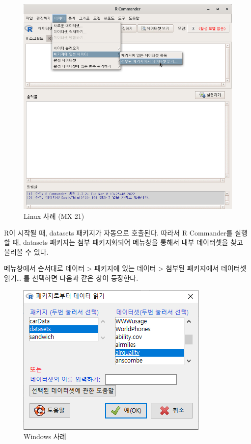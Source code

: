 \documentclass[
]{book}
\begin{document}
\begin{figure}
\centering
\includegraphics{fig/dataset-airquality-01.png}
\caption{Linux 사례 (MX 21)}
\end{figure}

R이 시작될 때, datasets 패키지가 자동으로 호출된다. 따라서 R Commander를 실행할 때, datasets 패키지는 첨부 패키지화되어 메뉴창을 통해서 내부 데이터셋을 찾고 불러올 수 있다.

메뉴창에서 순서대로 데이터 \textgreater{} 패키지에 있는 데이터 \textgreater{} 첨부된 패키지에서 데이터셋 읽기\ldots{} 를 선택하면 다음과 같은 창이 등장한다.

\begin{figure}
\centering
\includegraphics{fig/dataset-airquality-02.png}
\caption{Windows 사례}
\end{figure}
\end{document}
